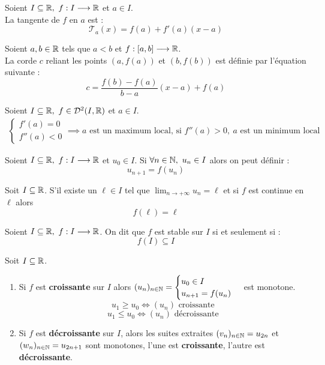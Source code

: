 \begin{proposition}
	Soient $I \subseteq \mathbb{R},\ f : I \longrightarrow \mathbb{R}$ et $a \in I$.
	\\
	La tangente de $f$ en $a$ est :
	\[ \mathcal{T}_a(x) = f(a) + f'(a)(x - a) \]
\end{proposition}

\begin{proposition}
	Soient $a, b \in \mathbb{R}$ tels que $a < b$ et $f : [a, b] \longrightarrow \mathbb{R}$.
	\\
	La corde $c$ reliant les points $(a, f(a))$ et $(b, f(b))$ est définie par l'équation suivante :
	\[ c = \frac{f(b) - f(a)}{b - a} (x - a) + f(a) \]
\end{proposition}

\begin{proposition}
	Soient $I \subseteq \mathbb{R},\ f \in \mathcal{D}^2(I, \mathbb{R})$ et $a \in I$.
	\begin{align*}
		\begin{cases}
			f'(a) = 0 \\
			f''(a) < 0
		\end{cases}
		\implies a \text{ est un maximum local, si } f''(a) > 0,\ a \text{  est un minimum local}
	\end{align*}
\end{proposition}

\begin{definition}
	Soient $I \subseteq \mathbb{R},\ f : I \longrightarrow \mathbb{R}$ et $u_0 \in I$.
	Si $\forall n \in \mathbb{N},\ u_n \in I$ alors on peut définir :
	\[ u_{n + 1} = f(u_n) \]
\end{definition}

\begin{lemma}
	Soit $I \subseteq \mathbb{R}$. S'il existe un $\ell \in I$ tel que $\lim_{n \to +\infty} u_n = \ell$ et si $f$ est continue en $\ell$ alors 
	\[ f(\ell) = \ell \]
\end{lemma}

\begin{definition}
	Soient $I \subseteq \mathbb{R},\ f : I \longrightarrow \mathbb{R}$. On dit que $f$ est stable sur $I$ si et seulement si : 
	\[ f(I) \subseteq I \]
\end{definition}

\begin{proposition}
	Soit $I \subseteq \mathbb{R}$.
	\begin{enumerate}
		\item Si $f$ est \textbf{croissante} sur $I$ alors 
		$
		(u_n)_{n \in \mathbb{N}} = 
		\begin{cases}
			u_0 \in I \\
			u_{n + 1} = f(u_n)
		\end{cases}
		$
		est monotone.
		\[ u_1 \geq u_0 \iff (u_n) \text{ croissante} \]
		\[ u_1 \leq u_0 \iff (u_n) \text{ décroissante} \]
		\item Si $f$ est \textbf{décroissante} sur $I$, alors les suites extraites $(v_n)_{n \in \mathbb{N}} = u_{2n}$ et $(w_n)_{n \in \mathbb{N}} = u_{2n + 1}$ sont monotones, l'une est \textbf{croissante}, l'autre est \textbf{décroissante}.
	\end{enumerate}
\end{proposition}

